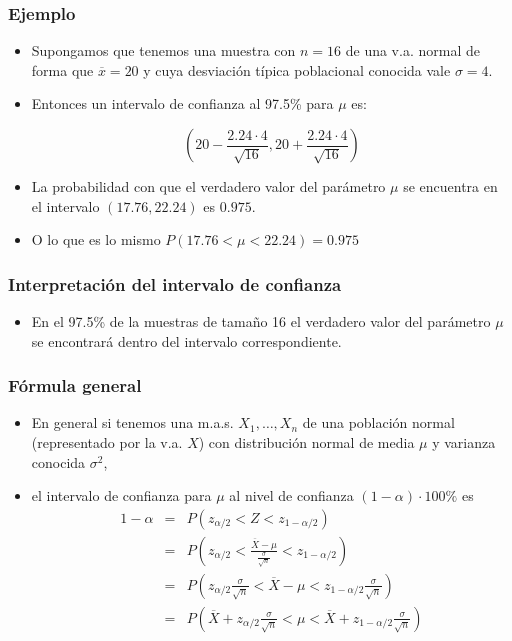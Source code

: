 \begin{frame}
    \frametitle{Ejemplo}
\begin{itemize}
\item Supongamos que tenemos una muestra con $n=16$ de una v.a. normal de forma que $\overline{x}=20$ y cuya desviación
    típica poblacional conocida vale $\sigma=4$.
 \item    Entonces un intervalo de confianza al 97.5\% para $\mu$
    es:

    $$\left( 20-\frac{2.24\cdot 4}{\sqrt{16}} ,
    20+\frac{2.24\cdot 4}{\sqrt{16}}\right)$$
\item La probabilidad con que el verdadero valor del parámetro $\mu$ se
    encuentra en el intervalo $\left( 17.76,22.24\right)$ es $0.975$.
\item     O lo que es lo mismo  $P(17.76<\mu<22.24)=0.975$
\end{itemize}
\end{frame}

\begin{frame}

    \frametitle{Interpretación del intervalo de confianza} 
\begin{itemize}
\item En el 97.5\%
    de la muestras de tamaño 16 el verdadero valor del parámetro
    $\mu$ se encontrará dentro del intervalo correspondiente.
\end{itemize}   
 \end{frame}

\begin{frame}
\frametitle{Fórmula general}
\begin{itemize}
\item En general si tenemos una m.a.s. $X_{1},\ldots,X_{n}$ de una población normal (representado
por la v.a. $X$) con distribución normal de media $\mu$ y varianza conocida $\sigma^2$,
\item el intervalo de confianza para $\mu$ al nivel de confianza $(1-\alpha)\cdot 100\%$ es
\begin{eqnarray*}
1-\alpha&=&P(z_{\alpha/2}<Z<z_{1-\alpha/2})\\
&=& P\left(z_{\alpha/2}<\frac{\overline{X}-\mu}{\frac{\sigma}{\sqrt{n}}}<z_{1-\alpha/2}\right)\\
& =& P\left(z_{\alpha/2}\frac{\sigma}{\sqrt{n}}<\overline{X}-\mu<z_{1-\alpha/2}\frac{\sigma}{\sqrt{n}}\right)\\
&=&
P\left(\overline{X}+z_{\alpha/2}\frac{\sigma}{\sqrt{n}}<\mu<\overline{X}+z_{1-\alpha/2}\frac{\sigma}
{\sqrt{n}}\right)
\end{eqnarray*}
\end{itemize}
\end{frame}

